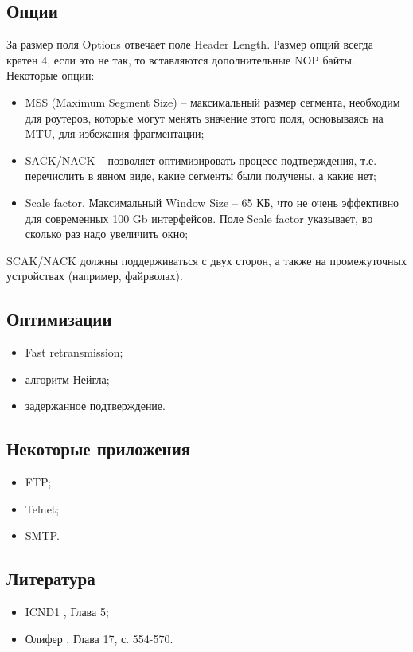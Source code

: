 \subsection{Опции}
За размер поля Options отвечает поле Header Length. Размер опций всегда кратен 4, если это не так, то вставляются дополнительные NOP байты. 
Некоторые опции:
\begin{itemize}
	\item MSS (Maximum Segment Size) -- максимальный размер сегмента, необходим для роутеров, которые могут менять значение этого поля, основываясь на MTU, для избежания фрагментации; 
	\item SACK/NACK -- позволяет оптимизировать процесс подтверждения, т.е. перечислить в явном виде, какие сегменты были получены, а какие нет;
	\item Scale factor. Максимальный Window Size -- 65 КБ, что не очень эффективно для современных 100 Gb интерфейсов. Поле Scale factor указывает, во сколько раз надо увеличить окно;
\end{itemize}

SCAK/NACK должны поддерживаться с двух сторон, а также на промежуточных устройствах (например, файрволах).

\subsection{Оптимизации}
\begin{itemize}
	\item Fast retransmission;
	\item алгоритм Нейгла;
	\item задержанное подтверждение.
\end{itemize}

\subsection{Некоторые приложения}
\begin{itemize}
	\item FTP;
	\item Telnet;
	\item SMTP.
\end{itemize}

\subsection{Литература}
\begin{itemize}
	\item ICND1 \cite{icnd1eng}, Глава 5;
	\item Олифер \cite{olipher}, Глава 17, с. 554-570.
\end{itemize}